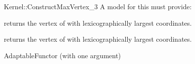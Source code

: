 \begin{ccRefFunctionObjectConcept}{Kernel::ConstructMaxVertex_3}
A model for this must provide:


 {returns the vertex of
   with lexicographically largest coordinates.}

 {returns the vertex of
   with lexicographically largest coordinates.}

\ccRefines
AdaptableFunctor (with one argument)

\ccSeeAlso
{}\\

\end{ccRefFunctionObjectConcept}
